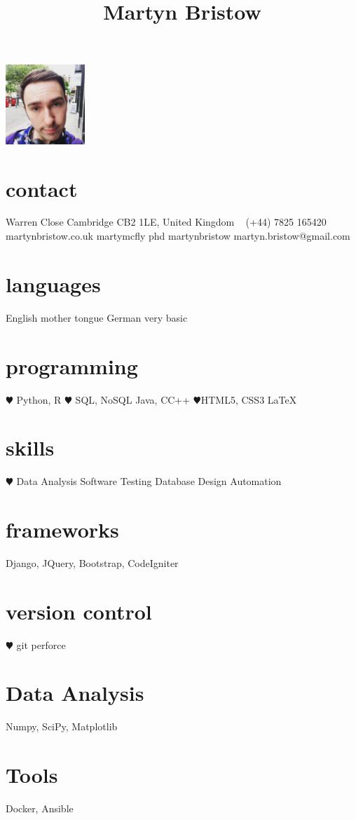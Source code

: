 \documentclass[]{cv-style}          %
\begin{document}
\lastupdated
\title{Martyn Bristow}


\begin{aside}
%
\includegraphics[width=3cm]{martyn.jpg}
\section{contact}
 Warren Close
\hspace*{25pt} Cambridge
\hspace*{25pt} CB2 1LE, 
\hspace*{25pt} United Kingdom
~
\faPhone (+44) 7825 165420
~
{\faGlobe martynbristow.co.uk}
{\faTwitter martymcfly phd}
{\faGithub martynbristow}
{\faEnvelope martyn.bristow@gmail.com}
\section{languages}
English mother tongue
German very basic
%
\section{programming}
{\color{red} $\varheartsuit$} Python, R
{\color{red} $\varheartsuit$} SQL, NoSQL
Java, C\/C++
{\color{red} $\varheartsuit$}HTML5, CSS3
\LaTeX{}
\section{skills}
{\color{red} $\varheartsuit$} Data Analysis
Software Testing
Database Design
Automation
\section{frameworks}
Django, JQuery, Bootstrap, CodeIgniter
\section{version control}
{\color{red} $\varheartsuit$} git
perforce
\section{Data Analysis}
Numpy, SciPy, Matplotlib
\section{Tools}
Docker, Ansible
\end{aside}
\end{document}
